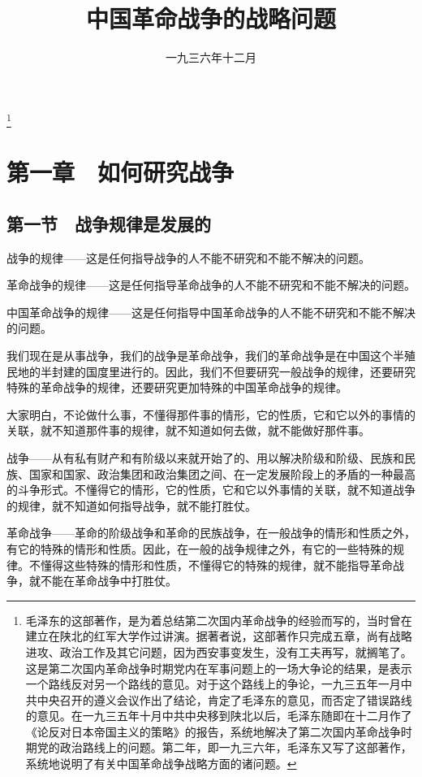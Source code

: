 
\title{中国革命战争的战略问题}
\date{一九三六年十二月}
\thanks{毛泽东的这部著作，是为着总结第二次国内革命战争的经验而写的，当时曾在建立在陕北的红军大学作过讲演。据著者说，这部著作只完成五章，尚有战略进攻、政治工作及其它问题，因为西安事变发生，没有工夫再写，就搁笔了。这是第二次国内革命战争时期党内在军事问题上的一场大争论的结果，是表示一个路线反对另一个路线的意见。对于这个路线上的争论，一九三五年一月中共中央召开的遵义会议作出了结论，肯定了毛泽东的意见，而否定了错误路线的意见。在一九三五年十月中共中央移到陕北以后，毛泽东随即在十二月作了《论反对日本帝国主义的策略》的报告，系统地解决了第二次国内革命战争时期党的政治路线上的问题。第二年，即一九三六年，毛泽东又写了这部著作，系统地说明了有关中国革命战争战略方面的诸问题。}
\maketitle


\section{第一章　如何研究战争}

\subsection{第一节　战争规律是发展的}

战争的规律——这是任何指导战争的人不能不研究和不能不解决的问题。

革命战争的规律——这是任何指导革命战争的人不能不研究和不能不解决的问题。

中国革命战争的规律——这是任何指导中国革命战争的人不能不研究和不能不解决的问题。

我们现在是从事战争，我们的战争是革命战争，我们的革命战争是在中国这个半殖民地的半封建的国度里进行的。因此，我们不但要研究一般战争的规律，还要研究特殊的革命战争的规律，还要研究更加特殊的中国革命战争的规律。

大家明白，不论做什么事，不懂得那件事的情形，它的性质，它和它以外的事情的关联，就不知道那件事的规律，就不知道如何去做，就不能做好那件事。

战争——从有私有财产和有阶级以来就开始了的、用以解决阶级和阶级、民族和民族、国家和国家、政治集团和政治集团之间、在一定发展阶段上的矛盾的一种最高的斗争形式。不懂得它的情形，它的性质，它和它以外事情的关联，就不知道战争的规律，就不知道如何指导战争，就不能打胜仗。

革命战争——革命的阶级战争和革命的民族战争，在一般战争的情形和性质之外，有它的特殊的情形和性质。因此，在一般的战争规律之外，有它的一些特殊的规律。不懂得这些特殊的情形和性质，不懂得它的特殊的规律，就不能指导革命战争，就不能在革命战争中打胜仗。

